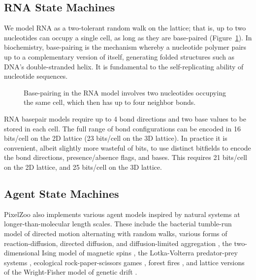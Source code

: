 \documentclass{acm_proc_article-sp}
\begin{document}
\subsection{RNA State Machines}

We model RNA as a two-tolerant random walk on the lattice\cite{LeoniVanderzande2003};
that is, up to two nucleotides can occupy a single cell, as long as they are base-paired
(Figure~\ref{fig:rna}).
In biochemistry, base-pairing is the mechanism whereby a nucleotide polymer pairs up to
a complementary version of itself, generating folded structures such as DNA's double-stranded helix.
It is fundamental to the self-replicating ability of nucleotide sequences.

\begin{figure}
\caption{
\label{fig:rna}
Base-pairing in the RNA model involves two nucleotides occupying the same cell, which then has up to four neighbor bonds.
}
\end{figure}

RNA basepair models require up to 4 bond directions and two base values to be stored in each cell.
The full range of bond configurations can be encoded in 16 bits/cell on the 2D lattice (23 bits/cell on the 3D lattice).
In practice it is convenient, albeit slightly more wasteful of bits,
to use distinct bitfields to encode the bond directions, presence/absence flags, and bases.
This requires 21 bits/cell on the 2D lattice, and 25 bits/cell on the 3D lattice.


\subsection{Agent State Machines}
\label{sec:AgentStateMachines}

PixelZoo also implements various agent models inspired by natural systems at longer-than-molecular length scales.
These include the bacterial tumble-run model of directed motion alternating with random walks\cite{RosserEtAl2013},
various forms of reaction-diffusion, directed diffusion, and diffusion-limited aggregation \cite{DLA},
the two-dimensional Ising model of magnetic spins \cite{Onsager1944},
the Lotka-Volterra predator-prey systems \cite{Lotka1910,Hirota199739},
ecological rock-paper-scissors games \cite{Tainaka2000},
forest fires \cite{Karafyllidis1997},
and lattice versions of the Wright-Fisher model of genetic drift \cite{MathiesonMcVean2013}.
\end{document}
